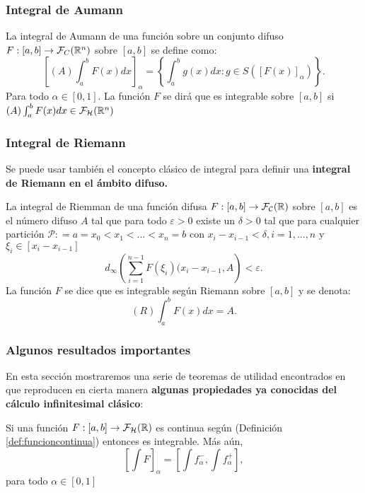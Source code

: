 \subsubsection{Integral de Aumann}
\begin{definicion}
  La integral de Aumann de una función sobre un conjunto difuso $F : [a, b] \rightarrow \mathcal{F}_C(\mathbb R^n)$ sobre $[a, b]$ se define como: 
  \[
  \left[
    (A) \int_{a}^{b} F(x) dx
    \right]_\alpha = \left\{
  \int_{a}^{b} g(x) dx : g \in S([F(x)]_\alpha)
  \right\}.
  \]
  Para todo $\alpha \in [0, 1]$. La función $F$ se dirá que es integrable sobre $[a, b]$ si $(A) \int_{a}^{b} F(x) dx \in \mathcal{F}_\mathcal{H}(\mathbb R^n)$
\end{definicion}

\subsubsection{Integral de Riemann}
Se puede usar también el concepto clásico de integral para definir una \textbf{integral de Riemann en el ámbito difuso.}

\begin{definicion}
  La integral de Riemman de una función difusa $F : [a, b] \rightarrow \mathcal{F}_\mathcal{C} (\mathbb R)$ sobre $[a, b]$ es el número difuso $A$ tal que para todo $\varepsilon > 0$ existe un $\delta > 0$ tal que para cualquier partición $\mathcal{P}: = a=x_0 < x_1 < ... < x_n = b$ con $x_i - x_{i-1} < \delta, i = 1, ..., n$ y $\xi_i \in [x_i - x_{i-1}]$
  \[
  	d_\infty \left(
  		\sum_{i=1}^{n-1} F(\xi_i)(x_i - x_{i-1}, A
  	\right) < \varepsilon.
  \]
  La función $F$ se dice que es integrable según Riemann sobre $[a, b]$ y se denota:
  \[
  	(R) \int_{a}^{b} F(x) dx = A.
  \]
\end{definicion}

\subsubsection{Algunos resultados importantes}
En esta sección mostraremos una serie de teoremas de utilidad encontrados en \cite{integral2} que reproducen en cierta manera \textbf{algunas propiedades ya conocidas del cálculo infinitesimal clásico}:

\begin{teorema}
  Si una función $F :  [a, b] \rightarrow \mathcal{F}_\mathcal{H}(\mathbb R)$ es continua según (Definición \ref{def:funcioncontinua}) entonces es integrable. Más aún,
  \[
  \left[
    \int F
    \right]_\alpha = \left[
    \int f_\alpha^-, \int f_\alpha^+
    \right],
  \] para todo $\alpha \in [0, 1]$
\end{teorema}

